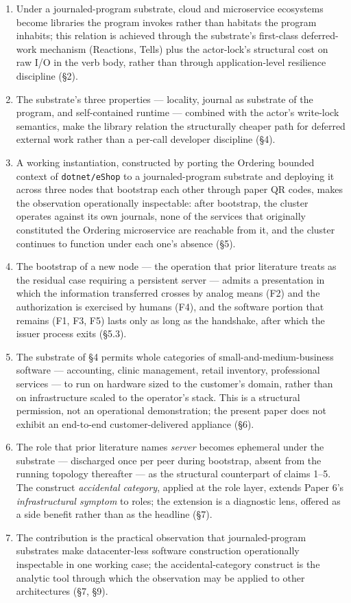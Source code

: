\documentclass[
]{article}
\newcounter{none} %
\providecommand{\tightlist}{%
  \setlength{\itemsep}{0pt}\setlength{\parskip}{0pt}}
\begin{document}
\begin{enumerate}
\def\labelenumi{\arabic{enumi}.}
\tightlist
\item
  Under a journaled-program substrate, cloud and microservice ecosystems
  become libraries the program invokes rather than habitats the program
  inhabits; this relation is achieved through the substrate's
  first-class deferred-work mechanism (Reactions, Tells) plus the
  actor-lock's structural cost on raw I/O in the verb body, rather than
  through application-level resilience discipline (§2).
\item
  The substrate's three properties --- locality, journal as substrate of
  the program, and self-contained runtime --- combined with the actor's
  write-lock semantics, make the library relation the structurally
  cheaper path for deferred external work rather than a per-call
  developer discipline (§4).
\item
  A working instantiation, constructed by porting the Ordering bounded
  context of \texttt{dotnet/eShop} to a journaled-program substrate and
  deploying it across three nodes that bootstrap each other through
  paper QR codes, makes the observation operationally inspectable: after
  bootstrap, the cluster operates against its own journals, none of the
  services that originally constituted the Ordering microservice are
  reachable from it, and the cluster continues to function under each
  one's absence (§5).
\item
  The bootstrap of a new node --- the operation that prior literature
  treats as the residual case requiring a persistent server --- admits a
  presentation in which the information transferred crosses by analog
  means (F2) and the authorization is exercised by humans (F4), and the
  software portion that remains (F1, F3, F5) lasts only as long as the
  handshake, after which the issuer process exits (§5.3).
\item
  The substrate of §4 permits whole categories of
  small-and-medium-business software --- accounting, clinic management,
  retail inventory, professional services --- to run on hardware sized
  to the customer's domain, rather than on infrastructure scaled to the
  operator's stack. This is a structural permission, not an operational
  demonstration; the present paper does not exhibit an end-to-end
  customer-delivered appliance (§6).
\item
  The role that prior literature names \emph{server} becomes ephemeral
  under the substrate --- discharged once per peer during bootstrap,
  absent from the running topology thereafter --- as the structural
  counterpart of claims 1--5. The construct \emph{accidental category},
  applied at the role layer, extends Paper 6's \emph{infrastructural
  symptom} to roles; the extension is a diagnostic lens, offered as a
  side benefit rather than as the headline (§7).
\item
  The contribution is the practical observation that journaled-program
  substrates make datacenter-less software construction operationally
  inspectable in one working case; the accidental-category construct is
  the analytic tool through which the observation may be applied to
  other architectures (§7, §9).
\end{enumerate}
\end{document}
